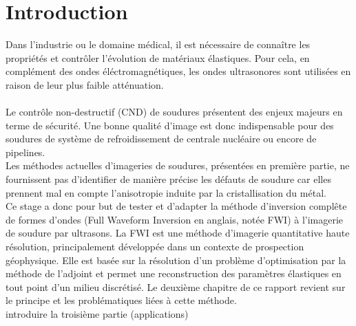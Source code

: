 \chapter{Introduction}

Dans l'industrie ou le domaine médical, il est nécessaire de connaître les propriétés et contrôler l'évolution de matériaux élastiques. Pour cela, en complément des ondes éléctromagnétiques,  les ondes ultrasonores sont utilisées en raison de leur plus faible atténuation.\\~\\

Le contrôle non-destructif (CND) de soudures présentent des enjeux majeurs en terme de sécurité. Une bonne qualité d'image est donc indispensable pour des soudures de système de refroidissement de centrale nucléaire ou encore de pipelines. \\
Les méthodes actuelles d'imageries de soudures, présentées en première partie, ne fournissent pas d'identifier de manière précise les défauts de soudure car elles prennent mal en compte l'anisotropie induite par la cristallisation du métal. \\


Ce stage a donc pour but de tester et d'adapter la méthode d'inversion complête de formes d'ondes (Full Waveform Inversion en anglais, notée FWI) à l'imagerie de soudure par ultrasons. La FWI est une méthode d'imagerie quantitative haute résolution, principalement développée dans un contexte de prospection géophysique. Elle est basée sur la résolution d'un problème d'optimisation par la méthode de l'adjoint et permet une reconstruction des paramètres élastiques en tout point d'un milieu discrétisé. Le deuxième chapitre de ce rapport revient sur le principe et les problématiques liées à cette méthode.\\


introduire la troisième partie (applications)






